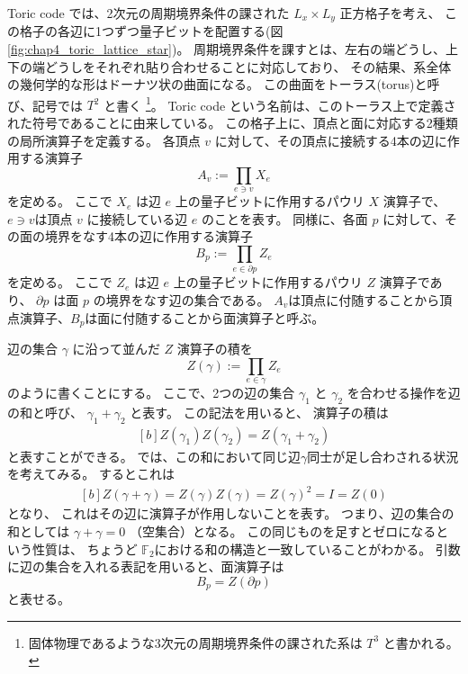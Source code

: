 \documentclass[../master.tex]{subfiles}
\begin{document}
Toric code では、2次元の周期境界条件の課された \(L_x\times L_y\) 正方格子を考え、
この格子の各辺に1つずつ量子ビットを配置する(図 \ref{fig:chap4_toric_lattice_star})。
周期境界条件を課すとは、左右の端どうし、上下の端どうしをそれぞれ貼り合わせることに対応しており、
その結果、系全体の幾何学的な形はドーナツ状の曲面になる。
この曲面をトーラス(torus)と呼び、記号では \(T^2\) と書く
\footnote{固体物理であるような3次元の周期境界条件の課された系は $T^3$ と書かれる。}。
Toric code という名前は、このトーラス上で定義された符号であることに由来している。
この格子上に、頂点と面に対応する2種類の局所演算子を定義する。
各頂点 \(v\) に対して、その頂点に接続する4本の辺に作用する演算子
\begin{equation}
    A_v := \prod_{e\ni v} X_e
\end{equation}
を定める。
ここで \(X_e\) は辺 \(e\) 上の量子ビットに作用するパウリ \(X\) 演算子で、
\(e\ni v\)は頂点 \(v\) に接続している辺 \(e\) のことを表す。
同様に、各面 \(p\) に対して、その面の境界をなす4本の辺に作用する演算子
\begin{equation}
    B_p := \prod_{e\in \partial p} Z_e
\end{equation}
を定める。
ここで \(Z_e\) は辺 \(e\) 上の量子ビットに作用するパウリ \(Z\) 演算子であり、
\(\partial p\) は面 \(p\) の境界をなす辺の集合である。
\(A_v\)は頂点に付随することから頂点演算子、\(B_p\)は面に付随することから面演算子と呼ぶ。

辺の集合 \(\gamma\) に沿って並んだ \(Z\) 演算子の積を
\begin{equation}
    Z(\gamma):=\prod_{e\in\gamma} Z_e
\end{equation}
のように書くことにする。
ここで、2つの辺の集合 $\gamma_1$ と $\gamma_2$ を合わせる操作を辺の和と呼び、
$\gamma_1 + \gamma_2$ と表す。
この記法を用いると、
演算子の積は
\begin{equation}\begin{aligned}[b]
    Z(\gamma_1)Z(\gamma_2) = Z(\gamma_1 + \gamma_2)
\end{aligned}\end{equation}
と表すことができる。
では、この和において同じ辺\(\gamma\)同士が足し合わされる状況を考えてみる。
するとこれは
\begin{equation}\begin{aligned}[b]
    Z(\gamma + \gamma) = Z(\gamma)Z(\gamma) = Z(\gamma)^2 = I = Z(0)
\end{aligned}\end{equation}
となり、
これはその辺に演算子が作用しないことを表す。
つまり、辺の集合の和としては $\gamma + \gamma = 0$ （空集合）となる。
この同じものを足すとゼロになるという性質は、
ちょうど $\mathbb{F}_2$における和の構造と一致していることがわかる。
引数に辺の集合を入れる表記を用いると、面演算子は
\begin{equation}
    B_p = Z(\partial p)
\end{equation}
と表せる。
\end{document}
